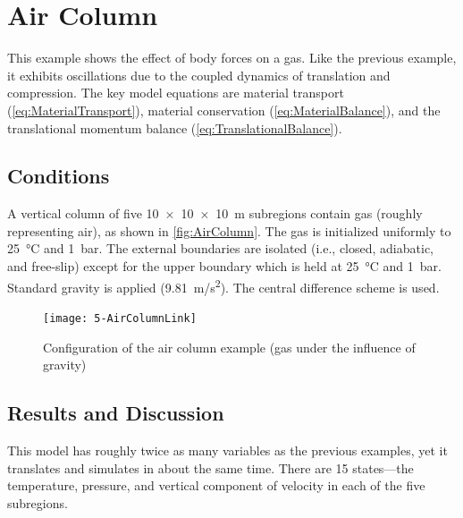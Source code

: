 \FloatBarrier %
\section{Air Column}

This example shows the effect of body forces on a gas.  Like the previous example, it exhibits oscillations due to the coupled dynamics of translation and compression.  The key model equations are material transport (\autoref{eq:MaterialTransport}), material conservation (\autoref{eq:MaterialBalance}), and the translational momentum balance (\autoref{eq:TranslationalBalance}).

\subsection{Conditions}

A vertical column of five \SI{10 x 10 x 10}{m} subregions contain  gas (roughly representing air), as shown in \autoref{fig:AirColumn}.  The gas is initialized uniformly to \SI{25}{\celsius} and \SI{1}{bar}.  The external boundaries are isolated (i.e., closed, adiabatic, and free-slip) except for the upper boundary which is held at \SI{25}{\celsius} and \SI{1}{bar}.  Standard gravity is applied (\SI{9.81}{m/s^2}).  The central difference scheme is used.

\begin{figure}[htbp]
  \hspace*{-3.2cm}\texttt{[image: 5-AirColumnLink]}\hspace*{-1.3cm}
  \caption{Configuration of the air column example (gas under the influence of gravity)}
  \label{fig:AirColumn}
\end{figure}

\subsection{Results and Discussion}



This model has roughly twice as many variables as the previous examples, yet it translates and simulates in about the same time.  There are 15 states---the temperature, pressure, and vertical component of velocity in each of the five subregions.

